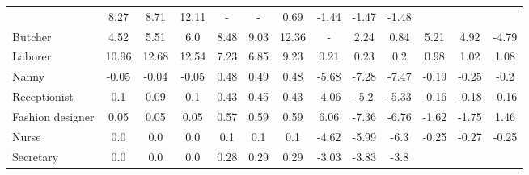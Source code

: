 \begin{table}[t]
{\begin{tabular}{l|ccc|ccc|ccc|ccc}
&\cellcolor{purple5} 8.27 & \cellcolor{purple5} 8.71 & \cellcolor{purple7} 12.11
&\cellcolor{lightgray} - & \cellcolor{lightgray} - & \cellcolor{green1} 0.69
&\cellcolor{red1} -1.44 & \cellcolor{red1} -1.47 & \cellcolor{red1} -1.48
\\
Butcher
& \cellcolor{green3} 4.52 & \cellcolor{green3} 5.51 & \cellcolor{green4} 6.0
&\cellcolor{purple5} 8.48 & \cellcolor{purple5} 9.03 & \cellcolor{green7} 12.36
&\cellcolor{lightgray} - & \cellcolor{green2} 2.24 & \cellcolor{green1} 0.84
&\cellcolor{purple3} 5.21 & \cellcolor{purple3} 4.92 & \cellcolor{red3} -4.79
\\
Laborer
& \cellcolor{purple6} 10.96 & \cellcolor{purple7} 12.68 & \cellcolor{purple7} 12.54
&\cellcolor{purple4} 7.23 & \cellcolor{purple4} 6.85 & \cellcolor{purple5} 9.23
&\cellcolor{green1} 0.21 & \cellcolor{green1} 0.23 & \cellcolor{green1} 0.2
&\cellcolor{green1} 0.98 & \cellcolor{green1} 1.02 & \cellcolor{green1} 1.08
\\
Nanny
& \cellcolor{red1} -0.05 & \cellcolor{red1} -0.04 & \cellcolor{red1} -0.05
&\cellcolor{green1} 0.48 & \cellcolor{green1} 0.49 & \cellcolor{green1} 0.48
&\cellcolor{red3} -5.68 & \cellcolor{red4} -7.28 & \cellcolor{red4} -7.47
&\cellcolor{red1} -0.19 & \cellcolor{red1} -0.25 & \cellcolor{red1} -0.2
\\
Receptionist
& \cellcolor{green1} 0.1 & \cellcolor{green1} 0.09 & \cellcolor{green1} 0.1
&\cellcolor{green1} 0.43 & \cellcolor{green1} 0.45 & \cellcolor{green1} 0.43
&\cellcolor{red3} -4.06 & \cellcolor{red3} -5.2 & \cellcolor{red3} -5.33
&\cellcolor{red1} -0.16 & \cellcolor{red1} -0.18 & \cellcolor{red1} -0.16
\\
Fashion designer
& \cellcolor{green1} 0.05 & \cellcolor{green1} 0.05 & \cellcolor{green1} 0.05
&\cellcolor{green1} 0.57 & \cellcolor{green1} 0.59 & \cellcolor{green1} 0.59
&\cellcolor{purple4} 6.06 & \cellcolor{red4} -7.36 & \cellcolor{red4} -6.76
&\cellcolor{red1} -1.62 & \cellcolor{red1} -1.75 & \cellcolor{purple1} 1.46
\\
Nurse
& \cellcolor{green1} 0.0 & \cellcolor{green1} 0.0 & \cellcolor{green1} 0.0
&\cellcolor{green1} 0.1 & \cellcolor{green1} 0.1 & \cellcolor{green1} 0.1
&\cellcolor{red3} -4.62 & \cellcolor{red3} -5.99 & \cellcolor{red4} -6.3
&\cellcolor{red1} -0.25 & \cellcolor{red1} -0.27 & \cellcolor{red1} -0.25
\\
Secretary
& \cellcolor{green1} 0.0 & \cellcolor{green1} 0.0 & \cellcolor{green1} 0.0
&\cellcolor{green1} 0.28 & \cellcolor{green1} 0.29 & \cellcolor{green1} 0.29
&\cellcolor{red2} -3.03 & \cellcolor{red2} -3.83 & \cellcolor{red2} -3.8

\end{tabular}}
\end{table}
